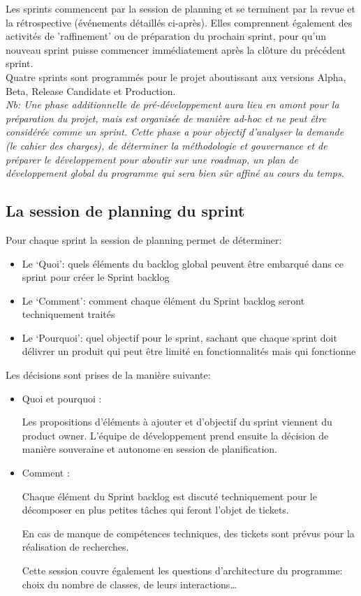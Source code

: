 Les sprints commencent par la session de planning et se terminent par la revue et la rétrospective (événements détaillés ci-après). Elles comprennent également des activités de 'raffinement' ou de préparation du prochain sprint,
 pour qu’un nouveau sprint puisse commencer immédiatement après la clôture du précédent sprint.\\

Quatre sprints sont programmés pour le projet aboutissant aux versions Alpha, Beta, Release Candidate et 
Production.\\

\emph{Nb: Une phase additionnelle de pré-développement aura lieu en amont pour la préparation du projet,
 mais est organisée de manière ad-hoc et ne peut être considérée comme un sprint. 
 Cette phase a pour objectif d’analyser la demande (le cahier des charges), de déterminer la méthodologie
 et gouvernance et de préparer le développement pour aboutir sur une roadmap, un plan de développement 
 global du programme qui sera bien sûr affiné au cours du temps.
}

\subsection{La session de planning du sprint}

Pour chaque sprint la session de planning permet de déterminer:

\begin{itemize}
    \item Le ‘Quoi’: quels éléments du backlog global peuvent être embarqué dans ce sprint pour créer le Sprint backlog
    \item Le ‘Comment’: comment chaque élément du Sprint backlog seront techniquement traités
    \item Le ‘Pourquoi’: quel objectif pour le sprint, sachant que chaque sprint doit délivrer un produit qui peut être limité en fonctionnalités mais qui fonctionne
\end{itemize}

Les décisions sont prises de la manière suivante:
\begin{itemize}
      \item Quoi et pourquoi :
       
      Les propositions d'éléments à ajouter et d’objectif du sprint viennent du product owner. L'équipe de développement prend ensuite la décision de manière souveraine
       et autonome en session de planification.
       \item Comment :
       
       Chaque élément du Sprint backlog est discuté techniquement pour le décomposer en plus petites tâches qui feront l’objet de tickets. 
       
       En cas de manque de compétences techniques, des tickets sont prévus pour la réalisation de recherches.
       
       Cette session couvre également les questions d’architecture du programme: choix du nombre de classes, de leurs interactions…

\end{itemize}

